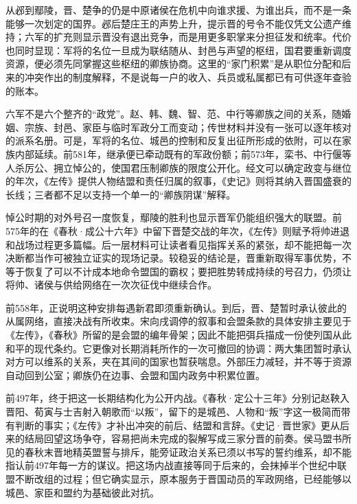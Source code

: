 从邲到鄢陵，晋、楚争的仍是中原诸侯在危机中向谁求援、为谁出兵，而不是一条能够一次划定的国界。邲后楚庄王的声势上升，提示晋的号令不能仅凭文公遗产维持；六军的扩充则显示晋没有退出竞争，而是用更多职掌来分担征发和统率。代价也同时显现：军将的名位一旦成为联结随从、封邑与声望的枢纽，国君要重新调度资源，便必须先同掌握这些枢纽的卿族协商。这里的“家门积累”是从职位分配和后来的冲突作出的制度解释，不是说每一户的收入、兵员或私属都已有可供逐年查验的账本。

六军不是六个整齐的“政党”。赵、韩、魏、智、范、中行等卿族之间的关系，随婚姻、宗族、封邑、家臣与临时军政分工而变动；传世材料并没有一张可以逐年核对的派系名册。可是，军将的名位、城邑的控制和反复出征所形成的依附，可以在家族内部延续。前581年，继承便已牵动既有的军政份额；前573年，栾书、中行偃等人杀厉公、拥立悼公的，使国君压制卿族的限度公开化。经文可以确定政变与继位的年次，《左传》提供人物结盟和责任归属的叙事，《史记》则将其纳入晋国盛衰的长线；三者都不足以支持一个单一的“卿族阴谋”解释。

悼公时期的对外号召一度恢复，鄢陵的胜利也显示晋军仍能组织强大的联盟。前575年的在《春秋·成公十六年》中留下晋楚交战的年次，《左传》则赋予将帅进退和战场过程更多篇幅。后一层材料可让读者看见指挥关系的紧张，却不能把每一次决断都当作可被独立证实的现场记录。较稳妥的结论是，晋重新取得军事优势，不等于恢复了可以不计成本地命令盟国的霸权；要把胜势转成持续的号召力，仍须让将帅、诸侯与供给网络在一次次征伐中继续合作。

前558年，正说明这种安排每遇新君即须重新确认。到后，晋、楚暂时承认彼此的从属网络，直接决战有所收束。宋向戌调停的叙事和会盟条款的具体安排主要见于《左传》，《春秋》所留的是会盟的编年骨架；因此不能把弭兵描成一份使列国从此和平的现代条约。它更像对长期消耗所作的一次可撤回的协调：两大集团暂时承认对方可以维系的关系，夹在其间的国家也暂获喘息。外部压力减轻，并不等于资源自动回到公室；卿族仍在边事、会盟和国内政务中积累位置。

前497年，终于把这一长期结构化为公开内战。《春秋·定公十三年》分别记赵鞅入晋阳、荀寅与士吉射入朝歌而“以叛”，留下的是城邑、人物和“叛”字这一极简而带有判断的事实；《左传》才补出冲突的前后、结盟和言辞。《史记·晋世家》更从后来的结局回望这场争夺，容易把尚未完成的裂解写成三家分晋的前奏。侯马盟书所见的春秋末晋地精英盟誓与排斥，能旁证政治关系已须以书写的誓约维系，却不能指认前497年每一方的谋议。把这场内战直接等同于后来的，会抹掉半个世纪中联盟不断改组的过程；但它确实显示，原本服务于晋国动员的军政网络，已经能够以城邑、家臣和盟约为基础彼此对抗。

